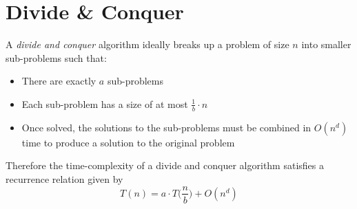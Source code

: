 \documentclass{article}
\newcommand{\ti}[1]{\textit{#1}}
\newcommand{\x}{\cdot}
\begin{document}

\section{Divide \& Conquer}
A \ti{divide and conquer} algorithm ideally breaks up a problem of size $n$ into smaller sub-problems such that:
\begin{itemize}
	\item There are exactly $a$ sub-problems
	\item Each sub-problem has a size of at most $\displaystyle \frac{1}{b}\x n$
	\item Once solved, the solutions to the sub-problems must be combined in $O(n^d)$ time to produce a solution to the original problem
\end{itemize}
Therefore the time-complexity of a divide and conquer algorithm satisfies a recurrence relation given by
\[T(n) = a\x T\Big(\frac{n}{b}\Big) + O(n^d)\]
\end{document}
